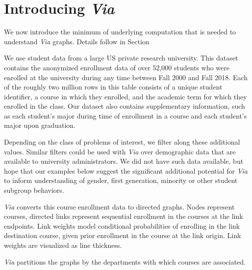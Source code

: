 \section{Introducing \em{Via}}
\label{sec:viaIntro}

We now introduce the minimum of underlying computation that is needed
to understand {\em Via} graphs. Details follow in
Section~

We use student data from a large US private research university. This
dataset contains the anonymized enrollment data of over 52,000
students who were enrolled at the university during any time between
Fall 2000 and Fall 2018. Each of the roughly two million rows in this
table consists of a unique student identifier, a course in which they
enrolled, and the academic term for which they enrolled in the
class. Our dataset also contains supplementary information, such as
each student's major during time of enrollment in a course and each
student's major upon graduation.

Depending on the class of problems of interest, we filter along these
additional values. Similar filters could be used with {\em Via} over
demographic data that are available to university administrators. We
did not have such data available, but hope that our examples below
suggest the significant additional potential for {\em Via} to inform
understanding of gender, first generation, minority or other student
subgroup behaviors.

{\em Via} converts this course enrollment data to directed graphs.
Nodes represent courses, directed links represent sequential
enrollment in the courses at the link endpoints. Link weights model
conditional probabilities of enrolling in the link destination course,
given prior enrollment in the course at the link origin. Link weights
are visualized as line thickness.

{\em Via} partitions the graphs by the departments with which courses
are associated. 

